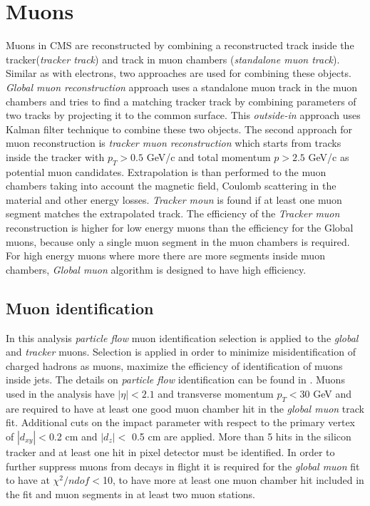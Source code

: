 \section{Muons}

Muons in CMS are reconstructed by combining a reconstructed track inside the tracker(\textit{tracker track}) and track in muon chambers (\textit{standalone muon track}). Similar as with electrons, two approaches are used for combining these objects. \textit{Global muon reconstruction} approach uses a standalone muon track in the muon chambers and tries to find a matching tracker track by combining parameters of two tracks by projecting it to the common surface. This \textit{outside-in} approach uses Kalman filter technique \cite{Frühwirth1987444} to combine these two objects. The second approach for muon reconstruction is \textit{tracker muon reconstruction} which starts from tracks inside the tracker with $p_T>0.5$ GeV/c and total momentum $p>2.5$ GeV/c as potential muon candidates. Extrapolation is than performed to the muon chambers taking into account the magnetic field, Coulomb scattering in the material and other energy losses. \textit{Tracker moun} is found if at least one muon segment matches the extrapolated track. The efficiency of the \textit{Tracker muon} reconstruction is higher for low energy muons than the efficiency for the Global muons, because only a single muon segment in the muon chambers is required. For high energy muons where more there are more segments inside muon chambers, \textit{Global muon} algorithm is designed to have high efficiency.    


\subsection{Muon identification}
In this analysis \textit{particle flow} muon identification selection is applied to the \textit{global} and \textit{tracker} muons. Selection is applied in order to minimize misidentification of charged hadrons as muons, maximize the efficiency of identification of muons inside jets. The details on \textit{particle flow} identification can be found in \cite{CMS-PAS-PFT-10-003}. Muons used in the analysis have $|\eta|<2.1$ and transverse momentum $p_T<30$ GeV and are required to have at least one good muon chamber hit in the \textit{global muon} track fit. Additional cuts on the impact parameter with respect to the primary vertex of $|d_{xy}|<$0.2 cm and $|d_z|<$ 0.5 cm are applied. More than 5 hits in the silicon tracker and at least one hit in pixel detector must be identified. In order to further suppress muons from decays in flight it is required for the \textit{global muon} fit to have at $\chi^2/ndof<$10, to have more at least one muon chamber hit included in the fit and muon segments in at least two muon stations.
 

